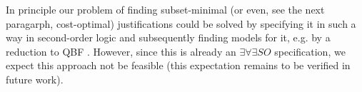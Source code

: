 



In principle our problem of finding subset-minimal (or even, see the next paragarph, cost-optimal) justifications could be solved by specifying it in such a way in second-order logic and subsequently finding models for it, e.g. by a reduction to QBF \cite{kr/BogaertsTS16,kr/vanderHallenJ18}. 
However, since this is already an $\exists\forall\exists SO$ specification, we expect this approach not be feasible (this expectation remains to be verified in future work). 

